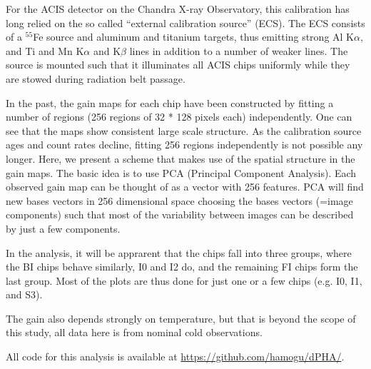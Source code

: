 \documentclass[]{spie}  %
\begin{document}
For the ACIS detector on the Chandra X-ray Observatory, this calibration has long relied on the so called ``external calibration source'' (ECS). The ECS consists of a $^{55}$Fe source and aluminum and titanium targets, thus emitting strong Al K$\alpha$, and Ti and Mn K$\alpha$ and K$\beta$ lines in addition to a number of weaker lines. The source is mounted such that it illuminates all ACIS chips uniformly while they are stowed during radiation belt passage.

In the past, the gain maps for each chip have been constructed by fitting a number of regions (256 regions of 32 * 128 pixels each) independently. One can see that the maps show consistent large scale structure. As the calibration source ages and count rates decline, fitting 256 regions independently is not possible any longer. Here, we present a scheme that makes use of the spatial structure in the gain maps.
The basic idea is to use PCA (Principal Component Analysis). Each observed gain map can be thought of as a vector with 256 features. PCA will find new bases vectors in 256 dimensional space choosing the bases vectors (=image components) such that most of the variability between images can be described by just a few components.

In the analysis, it will be apprarent that the chips fall into three groups, where the BI chips behave similarly, I0 and I2 do, and the remaining FI chips form the last group. Most of the plots are thus done for just one or a few chips (e.g. I0, I1, and S3).

The gain also depends strongly on temperature, but that is beyond the scope of this study, all data here is from nominal cold observations.

All code for this analysis is available at \url{https://github.com/hamogu/dPHA/}.
\end{document}
